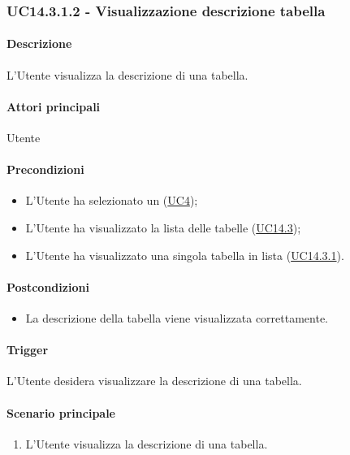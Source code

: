 
\subsubsection{UC14.3.1.2 - Visualizzazione descrizione tabella}\label{UC14point3point1point2}
\paragraph*{Descrizione}
L'Utente visualizza la descrizione di una tabella.

\paragraph*{Attori principali}
Utente

\paragraph*{Precondizioni}
\begin{itemize}
  \item L'Utente ha selezionato un  (\hyperref[UC4]{UC4});
  \item L'Utente ha visualizzato la lista delle tabelle (\hyperref[UC14point3]{UC14.3});
  \item L'Utente ha visualizzato una singola tabella in lista (\hyperref[UC14point3point1]{UC14.3.1}).
\end{itemize}

\paragraph*{Postcondizioni}
\begin{itemize}
  \item La descrizione della tabella viene visualizzata correttamente.
\end{itemize}

\paragraph*{Trigger}
L'Utente desidera visualizzare la descrizione di una tabella.

\paragraph*{Scenario principale}
\begin{enumerate}
  \item L'Utente visualizza la descrizione di una tabella.
\end{enumerate}